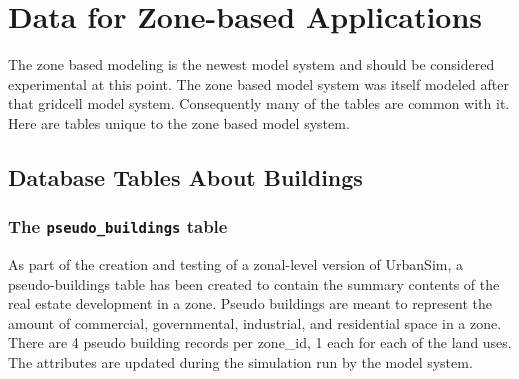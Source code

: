 \chapter{Data for Zone-based Applications}

The zone based modeling is the newest model system and should be considered experimental at this point.  The zone based model system was itself modeled after that gridcell model system.  Consequently many of the tables are common with it.  Here are tables unique to the zone based model system.

\section{Database Tables About Buildings}

\subsection{The {\tt pseudo\_buildings} table}
\label{sec:db-tables-pseudo-buildings}

As part of the creation and testing of a zonal-level version of UrbanSim, a pseudo-buildings table has been created to contain the summary contents of the real estate development in a zone.  Pseudo buildings are meant to represent the amount of commercial, governmental, industrial, and residential space in a zone.  There are 4 pseudo building records per zone\_id, 1 each for each of the land uses.  The attributes are updated during the simulation run by the model system.

